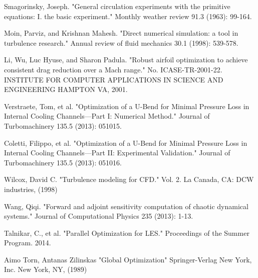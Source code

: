 \documentclass[a4paper,onecolumn]{article}
\theoremstyle{remark}
\begin{document}
\begin{thebibliography}{9}
Smagorinsky, Joseph. 
"General circulation experiments with the primitive equations: I. the basic experiment." 
Monthly weather review 91.3 (1963): 99-164.

Moin, Parviz, and Krishnan Mahesh. 
"Direct numerical simulation: a tool in turbulence research." 
Annual review of fluid mechanics 30.1 (1998): 539-578.

Li, Wu, Luc Hyuse, and Sharon Padula. 
"Robust airfoil optimization to achieve consistent drag reduction over a Mach range."
No. ICASE-TR-2001-22. INSTITUTE FOR COMPUTER APPLICATIONS IN SCIENCE AND ENGINEERING HAMPTON VA, 2001.

Verstraete, Tom, et al. 
"Optimization of a U-Bend for Minimal Pressure Loss in Internal Cooling Channels—Part I: Numerical Method." 
Journal of Turbomachinery 135.5 (2013): 051015.

Coletti, Filippo, et al. 
"Optimization of a U-Bend for Minimal Pressure Loss in Internal Cooling Channels—Part II: Experimental Validation." 
Journal of Turbomachinery 135.5 (2013): 051016.

Wilcox, David C. 
"Turbulence modeling for CFD." 
Vol. 2. La Canada, CA: DCW industries, (1998)

Wang, Qiqi. 
"Forward and adjoint sensitivity computation of chaotic dynamical systems." 
Journal of Computational Physics 235 (2013): 1-13.

Talnikar, C., et al. "Parallel Optimization for LES." Proceedings of the Summer Program. 2014.

Aimo Torn, Antanas Zilinskas
"Global Optimization"
Springer-Verlag New York, Inc. New York, NY, (1989)


\end{thebibliography}
\end{document}
